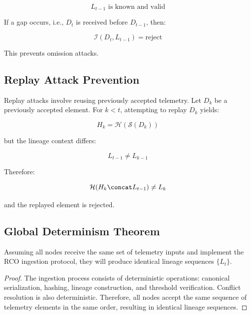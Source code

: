 \begin{equation}
L_{t-1} \text{ is known and valid}
\end{equation}

If a gap occurs, i.e., $D_t$ is received before $D_{t-1}$, then:

\begin{equation}
\mathcal{I}(D_t, L_{t-1}) = \text{reject}
\end{equation}

This prevents omission attacks.

\subsection{Replay Attack Prevention}

Replay attacks involve reusing previously accepted telemetry. Let $D_k$ be a previously accepted element. For $k < t$, attempting to replay $D_k$ yields:

\begin{equation}
H_k = \mathcal{H}(\mathcal{S}(D_k))
\end{equation}

but the lineage context differs:

\begin{equation}
L_{t-1} \neq L_{k-1}
\end{equation}

Therefore:

\begin{equation}
\mathcal{H}(H_k \concat L_{t-1}) \neq L_k
\end{equation}

and the replayed element is rejected.

\subsection{Global Determinism Theorem}

\begin{theorem}
Assuming all nodes receive the same set of telemetry inputs and implement the RCO ingestion protocol, they will produce identical lineage sequences $\{L_t\}$.
\end{theorem}

\begin{proof}
The ingestion process consists of deterministic operations: canonical serialization, hashing, lineage construction, and threshold verification. Conflict resolution is also deterministic. Therefore, all nodes accept the same sequence of telemetry elements in the same order, resulting in identical lineage sequences.
\end{proof}


